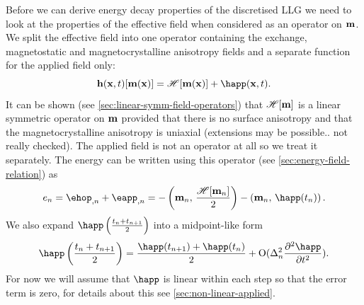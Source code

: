 Before we can derive energy decay properties of the discretised LLG we need to look at the properties of the effective field when considered as an operator on $\mathbf{m}$.
We split the effective field into one operator containing the exchange, magnetostatic and magnetocrystalline anisotropy fields and a separate function for the applied field only:
\begin{equation}
  \label{eq:hop}
  \hv(\xv, t)[\mv(\xv)] = \hop [\mv(\xv)] + \happ(\xv, t).
\end{equation}
It can be shown (see \autoref{sec:linear-symm-field-operators}) that $\mathscr{H}[\mathbf{m}]$ is a linear symmetric operator on $\mathbf{m}$ provided that there is no surface anisotropy and that the magnetocrystalline anisotropy is uniaxial (extensions may be possible.. not really checked).
The applied field is not an operator at all so we treat it separately. The energy can be written using this operator (see \autoref{sec:energy-field-relation}) as
\begin{equation}
  \label{eq:energy-hop}
  \e_n = \ehop_{,n} + \eapp_{,n} = - \ip{\mv_n}{\frac{\hop[\mv_n]}{2}} - \ip{\mv_n}{\happ(t_n)}.
\end{equation}
We also expand $\mphapp$ into a midpoint-like form
\begin{equation}
  \mphapp = \frac{\happ(t_{n+1}) + \happ(t_n)}{2} + \order{\dtn^2 \spd{\happ}{t}}.
  \label{eq:happ-midpoint}
\end{equation}
For now we will assume that $\happ$ is linear within each step so that the error term is zero, for details about this see \autoref{sec:non-linear-applied}.

